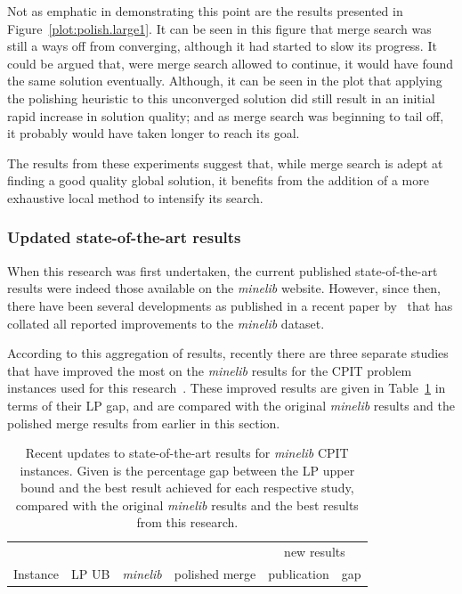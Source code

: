\documentclass[journal]{IEEEtran}
\begin{document}
Not as emphatic in demonstrating this point are the results presented in Figure~\ref{plot:polish.large1}. It can be seen in this figure that merge search was still a ways off from converging, although it had started to slow its progress. It could be argued that, were merge search allowed to continue, it would have found the same solution eventually. Although, it can be seen in the plot that applying the polishing heuristic to this unconverged solution did still result in an initial rapid increase in solution quality; and as merge search was beginning to tail off, it probably would have taken longer to reach its goal.

The results from these experiments suggest that, while merge search is adept at finding a good quality global solution, it benefits from the addition of a more exhaustive local method to intensify its search. 

\subsubsection*{Updated state-of-the-art results}

When this research was first undertaken, the current published state-of-the-art results were indeed those available on the \emph{minelib} website. However, since then, there have been several developments as published in a recent paper by~\cite{minelib-improved} that has collated all reported improvements to the \emph{minelib} dataset.

According to this aggregation of results, recently there are three separate studies that have improved the most on the \emph{minelib} results for the CPIT problem instances used for this research~\cite{newman-improved,zuck-small-improved,JELVEZ20161169}. These improved results are given in Table~\ref{tab:mine:update} in terms of their LP gap, and are compared with the original \emph{minelib} results and the polished merge results from earlier in this section.

\begin{table}[h!]
\centering
\caption[Recent updates to state-of-the-art results for \emph{minelib} CPIT instances]{Recent updates to state-of-the-art results for \emph{minelib} CPIT instances. Given is the percentage gap between the LP upper bound and the best result achieved for each respective study, compared with the original \emph{minelib} results and the best results from this research.}\label{tab:mine:update}
\begin{adjustbox}{width=0.45\textwidth}
\begin{tabular}{lrrrrr} \toprule
& & & & \multicolumn{2}{c}{new results}\\ 
\cmidrule(lr){5-6}
Instance & \multicolumn{1}{c}{LP UB} & \multicolumn{1}{c}{\emph{minelib}} & \multicolumn{1}{c}{polished merge} & \multicolumn{1}{c}{publication} & \multicolumn{1}{c}{gap}\\ 
\midrule
%

%
\bottomrule
\end{tabular}
\end{adjustbox}
\end{table}
\end{document}
